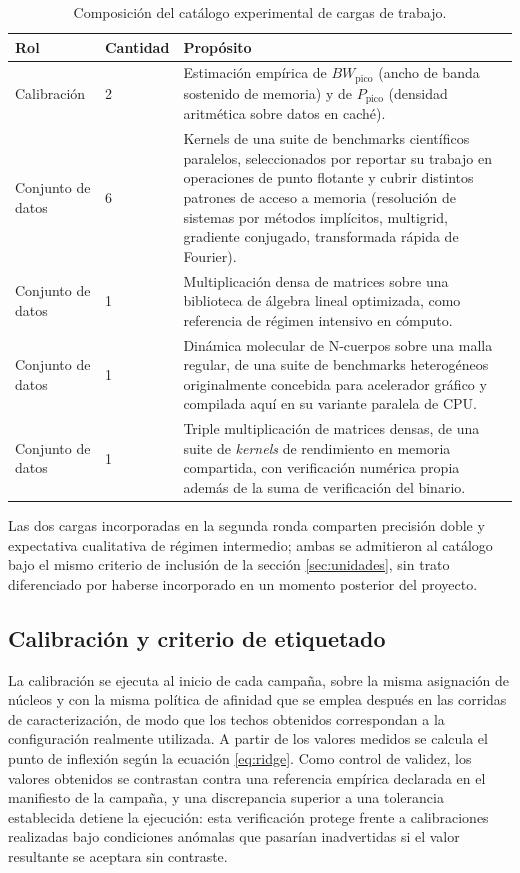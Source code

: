 \documentclass[12pt,oneside,spanish]{book}
\begin{document}
\begin{table}[H]
\centering
\caption{Composición del catálogo experimental de cargas de trabajo.}
\label{tab:catalogo}
\begin{tabular}{@{}p{3.2cm}p{2.6cm}p{8.6cm}@{}}
\toprule
\textbf{Rol} & \textbf{Cantidad} & \textbf{Propósito} \\
\midrule
Calibración & 2 & Estimación empírica de $BW_{\text{pico}}$ (ancho de banda sostenido de memoria) y de $P_{\text{pico}}$ (densidad aritmética sobre datos en caché). \\
\addlinespace
Conjunto de datos & 6 & Kernels de una suite de benchmarks científicos paralelos, seleccionados por reportar su trabajo en operaciones de punto flotante y cubrir distintos patrones de acceso a memoria (resolución de sistemas por métodos implícitos, multigrid, gradiente conjugado, transformada rápida de Fourier). \\
\addlinespace
Conjunto de datos & 1 & Multiplicación densa de matrices sobre una biblioteca de álgebra lineal optimizada, como referencia de régimen intensivo en cómputo. \\
\addlinespace
Conjunto de datos & 1 & Dinámica molecular de N-cuerpos sobre una malla regular, de una suite de benchmarks heterogéneos originalmente concebida para acelerador gráfico y compilada aquí en su variante paralela de CPU. \\
\addlinespace
Conjunto de datos & 1 & Triple multiplicación de matrices densas, de una suite de \textit{kernels} de rendimiento en memoria compartida, con verificación numérica propia además de la suma de verificación del binario. \\
\bottomrule
\end{tabular}
\end{table}

Las dos cargas incorporadas en la segunda ronda comparten precisión doble y expectativa cualitativa de régimen intermedio; ambas se admitieron al catálogo bajo el mismo criterio de inclusión de la sección \ref{sec:unidades}, sin trato diferenciado por haberse incorporado en un momento posterior del proyecto.

\subsection{Calibración y criterio de etiquetado}

La calibración se ejecuta al inicio de cada campaña, sobre la misma asignación de núcleos y con la misma política de afinidad que se emplea después en las corridas de caracterización, de modo que los techos obtenidos correspondan a la configuración realmente utilizada. A partir de los valores medidos se calcula el punto de inflexión según la ecuación \eqref{eq:ridge}. Como control de validez, los valores obtenidos se contrastan contra una referencia empírica declarada en el manifiesto de la campaña, y una discrepancia superior a una tolerancia establecida detiene la ejecución: esta verificación protege frente a calibraciones realizadas bajo condiciones anómalas que pasarían inadvertidas si el valor resultante se aceptara sin contraste.
\end{document}
